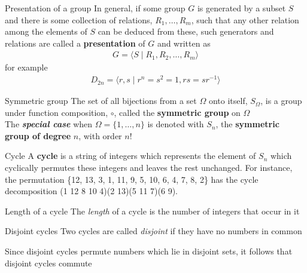 \documentclass[titlepage, 12pt]{book}
\begin{document}
\begin{definition}{Presentation of a group}{}
  In general, if some group $G$ is generated by a subset $S$ and there is
    some collection of relations, $R_1,\dots,R_m$, such that any other relation
    among the elements of $S$ can be deduced from these, such generators and
    relations are called a \textbf{presentation} of $G$ and written as
    \begin{gather*}
      G = \langle S\mid R_1, R_2,\dots, R_m\rangle
    \end{gather*}
    for example
    \begin{gather*}
      D_{2n} = \langle r, s\mid r^n = s^2 = 1, rs = sr^{-1}\rangle
    \end{gather*}
\end{definition}

\begin{definition}{Symmetric group}{}
  The set of all bijections from a set $\Omega$ onto itself, $S_\Omega$,
    is a group under function composition, $\circ$, called the \textbf{symmetric
    group} on $\Omega$\\

    The \textbf{\emph{special case}} when $\Omega = \{1,\dots,n\}$ is denoted with $S_n$,
    the \textbf{symmetric group of degree} $n$, with order $n$!
\end{definition}

\begin{definition}{Cycle}{}
  A \textbf{cycle} is a string of integers which represents the element of
    $S_n$ which cyclically permutes these integers and leaves the rest
    unchanged. For instance, the permutation \{12, 13, 3, 1, 11, 9, 5, 10, 6, 4,
    7, 8, 2\} has the cycle decomposition (1 12 8 10 4)(2 13)(5 11 7)(6 9).
\end{definition}

\begin{definition}{Length of a cycle}{}
  The \textit{length} of a cycle is the number of integers that occur in
    it
\end{definition}

\begin{definition}{Disjoint cycles}{}
  Two cycles are called \textit{disjoint} if they have no numbers in
    common
\end{definition}

\begin{proposition}{}{}
Since disjoint cycles permute numbers which lie in disjoint sets, it
follows that disjoint cycles commute
\end{proposition}
\end{document}

